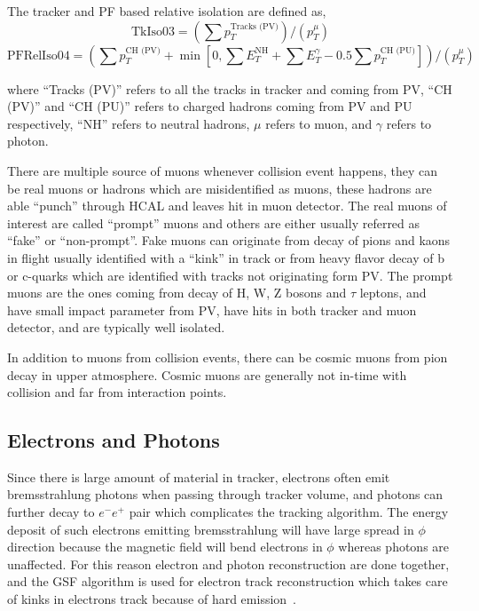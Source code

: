 The tracker and \gls{PF} based relative isolation are defined as,
%
\begin{equation}\label{eq:trackerRelIso-muon}
  \text{TkIso03} = \left( \sum p_{T}^{\text{Tracks (PV)}} \right) /
  \left( p_{T}^{\mu} \right)
\end{equation}
%
\begin{equation}\label{eq:pfRelIso-muon}
  \text{PFRelIso04} = \left( \sum p_{T}^{\text{CH (PV)}}
  + \min \left[ 0, \sum E_{T}^{\text{NH}} + \sum E_{T}^{\gamma}
    - 0.5 \sum p_{T}^{\text{CH (PU)}} \right] \right) /
  \left( p_{T}^{\mu} \right)
\end{equation}

where ``Tracks (PV)'' refers to all the tracks in tracker and coming from \gls{PV},
``CH (PV)'' and ``CH (PU)'' refers to charged hadrons coming from \gls{PV} and \gls{PU}
respectively, ``NH'' refers to neutral hadrons, \( \mu \) refers to muon, and
\( \gamma \) refers to photon.

There are multiple source of muons whenever collision event happens, they can be
real muons or hadrons which are misidentified as muons, these hadrons
are able ``punch'' through \gls{HCAL} and leaves hit in muon detector. The real
muons of interest are called ``prompt'' muons and others are either usually referred
as ``fake'' or ``non-prompt''. Fake muons can originate from decay of pions and kaons in flight
usually identified with a ``kink'' in track or from heavy flavor decay of b or c-quarks
which are identified with tracks not originating form \gls{PV}.
The prompt muons are the ones coming from decay of H, W, Z bosons and \( \tau \) leptons,
and have small impact parameter from \gls{PV}, have hits in both tracker
and muon detector, and are typically well isolated.

In addition to muons from collision events, there can be cosmic muons from pion decay in
upper atmosphere. Cosmic muons are generally not in-time with collision and far from
interaction points.

\subsection{
  Electrons and Photons
}

Since there is large amount of material in tracker, electrons often emit bremsstrahlung
photons when passing through tracker volume,
and photons can further decay to \( e^- e^+ \) pair which complicates the
tracking algorithm. The energy deposit of such electrons
emitting bremsstrahlung will have large spread in \( \phi \) direction because
the magnetic field will bend electrons in \( \phi \) whereas photons are unaffected.
For this reason electron and photon reconstruction are done together, and
the \gls{GSF} algorithm is used for electron track reconstruction
which takes care of kinks in electrons track because of hard emission~\cite{cms-electron-gsf}.

